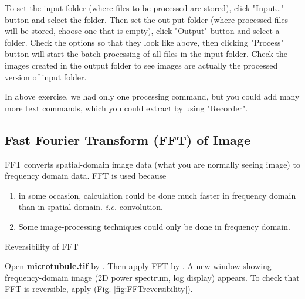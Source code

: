 \begin{indentexercise}{1}
To set the input folder (where files to be processed are stored), click
"Input\ldots" button and select the
folder. Then set the out put folder (where processed files will be
stored, choose one that is empty), click
"Output" button and select a folder.
Check the options so that they look like above, then clicking
"Process" button will start the batch
processing of all files in the input folder. Check the images created
in the output folder to see images are actually the processed version
of input folder.
\end{indentexercise}

In above exercise, we had only one processing command, but you could add
many more text commands, which you could extract by using
"Recorder".
\subsection{Fast Fourier Transform (FFT) of Image}

FFT converts spatial-domain image data (what you are normally seeing
image) to frequency domain data. FFT is used because 
\begin{enumerate}
\item in some occasion, calculation could be done much faster in frequency domain
than in spatial domain. \textit{i.e.} convolution. 
\item Some image-processing techniques could only be done in frequency domain. 
\end{enumerate}

\begin{indentexercise}{1}
Reversibility of FFT

Open \textbf{microtubule.tif} by . Then apply FFT by . A new window showing frequency-domain image (2D power spectrum, log display) appears. To check that FFT is reversible, apply  (Fig. \ref{fig:FFTreversibility}).

\end{indentexercise}

